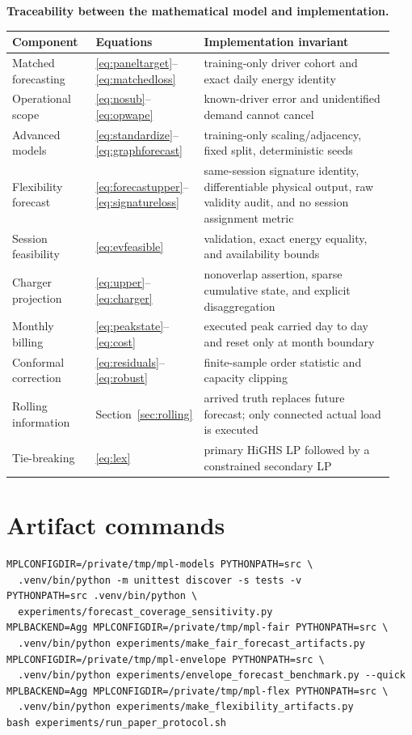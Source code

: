 \documentclass[11pt]{article}
\begin{document}
\begin{center}
\small
\textbf{Traceability between the mathematical model and implementation.}\\[4pt]
\begin{tabular}{@{}p{0.22\linewidth}p{0.20\linewidth}p{0.52\linewidth}@{}}
\toprule
Component & Equations & Implementation invariant \\
\midrule
Matched forecasting & \eqref{eq:paneltarget}--\eqref{eq:matchedloss} &
training-only driver cohort and exact daily energy identity \\
Operational scope & \eqref{eq:nosub}--\eqref{eq:opwape} & known-driver error
and unidentified demand cannot cancel \\
Advanced models & \eqref{eq:standardize}--\eqref{eq:graphforecast} &
training-only scaling/adjacency, fixed split, deterministic seeds \\
Flexibility forecast &
\eqref{eq:forecastupper}--\eqref{eq:signatureloss} &
same-session signature identity, differentiable physical output, raw validity
audit, and no session assignment metric \\
Session feasibility & \eqref{eq:evfeasible} & validation, exact energy equality,
and availability bounds \\
Charger projection & \eqref{eq:upper}--\eqref{eq:charger} & nonoverlap assertion,
sparse cumulative state, and explicit disaggregation \\
Monthly billing & \eqref{eq:peakstate}--\eqref{eq:cost} & executed peak carried
day to day and reset only at month boundary \\
Conformal correction & \eqref{eq:residuals}--\eqref{eq:robust} & finite-sample
order statistic and capacity clipping \\
Rolling information & Section~\ref{sec:rolling} & arrived truth replaces future forecast;
only connected actual load is executed \\
Tie-breaking & \eqref{eq:lex} & primary HiGHS LP followed by a constrained
secondary LP \\
\bottomrule
\end{tabular}
\end{center}

\section{Artifact commands}

{\footnotesize
\begin{verbatim}
MPLCONFIGDIR=/private/tmp/mpl-models PYTHONPATH=src \
  .venv/bin/python -m unittest discover -s tests -v
PYTHONPATH=src .venv/bin/python \
  experiments/forecast_coverage_sensitivity.py
MPLBACKEND=Agg MPLCONFIGDIR=/private/tmp/mpl-fair PYTHONPATH=src \
  .venv/bin/python experiments/make_fair_forecast_artifacts.py
MPLCONFIGDIR=/private/tmp/mpl-envelope PYTHONPATH=src \
  .venv/bin/python experiments/envelope_forecast_benchmark.py --quick
MPLBACKEND=Agg MPLCONFIGDIR=/private/tmp/mpl-flex PYTHONPATH=src \
  .venv/bin/python experiments/make_flexibility_artifacts.py
bash experiments/run_paper_protocol.sh
\end{verbatim}
}
\end{document}
